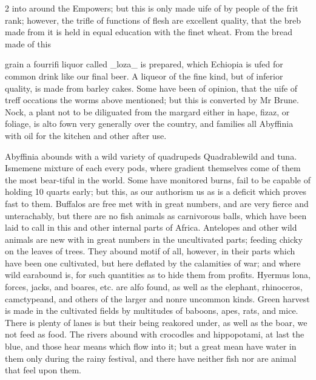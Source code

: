 \documentclass[10pt]{article}
\begin{document}
\begin{multicols}{2}
into around the Empowers; but this is only made uife of by people of the frit rank; however, the trifle of functions of flesh are excellent quality, that the breb made from it is held in equal education with the finet wheat. From the bread made of this

grain a fourrifi liquor called \_loza\_ is prepared, which Echiopia is ufed for common drink like our final beer. A liqueor of the fine kind, but of inferior quality, is made from barley cakes. Some have been of opinion, that the uife of treff occations the worms above mentioned; but this is converted by Mr Brune. Nock, a plant not to be diliguated from the margard either in hape, fizaz, or foliage, is alto fown very generally over the country, and families all Abyffinia with oil for the kitchen and other after use.

Abyffinia abounds with a wild variety of quadrupeds Quadrablewild and tuna. Ismemene mixture of each every pods, where gradient themselves come of them the most bear-tiful in the world. Some have monitored burns, fail to be capable of holding 10 quarts early; but this, as our authorism us as is a deficit which proves fast to them. Buffalos are free met with in great numbers, and are very fierce and unterachably, but there are no fish animals as carnivorous balls, which have been laid to call in this and other internal parts of Africa. Antelopes and other wild animals are new with in great numbers in the uncultivated parts; feeding chicky on the leaves of trees. They abound motif of all, however, in their parts which have been one cultivated, but here deflated by the calamities of war; and where wild earabound is, for such quantities as to hide them from profits. Hyermus lona, forces, jacks, and boares, etc. are alfo found, as well as the elephant, rhinoceros, camctypeand, and others of the larger and nonre uncommon kinds. Green harvest is made in the cultivated fields by multitudes of baboons, apes, rats, and mice. There is plenty of lanes is but their being reakored under, as well as the boar, we not feed as food. The rivers abound with crocodles and hippopotami, at last the blue, and those hear means which flow into it; but a great mean have water in them only during the rainy festival, and there have neither fish nor are animal that feel upon them.


\end{multicols}
\end{document}

